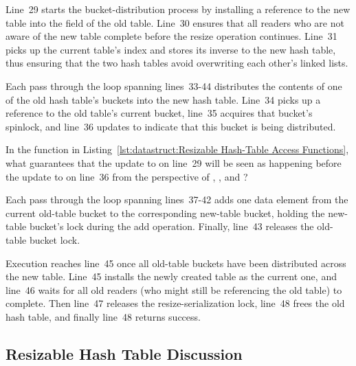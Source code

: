 Line~29 starts the bucket-distribution process by installing a reference
to the new table into the  field of the old table.
Line~30 ensures that all readers who are not aware of the new table
complete before the resize operation continues.
Line~31 picks up the current table's index and stores its inverse to
the new hash table, thus ensuring that the two hash tables avoid overwriting
each other's linked lists.

Each pass through the loop spanning lines~33-44 distributes the contents
of one of the old hash table's buckets into the new hash table.
Line~34 picks up a reference to the old table's current bucket,
line~35 acquires that bucket's spinlock, and line~36 updates
 to indicate that this bucket is being distributed.

\QuickQuiz{}
	In the  function in
	Listing~\ref{lst:datastruct:Resizable Hash-Table Access Functions},
	what guarantees that the update to  on line~29
	will be seen as happening before the update to 
	on line~36 from the perspective of ,
	, and ?
 \QuickQuizEnd

Each pass through the loop spanning lines~37-42 adds one data element
from the current old-table bucket to the corresponding new-table bucket,
holding the new-table bucket's lock during the add operation.
Finally, line~43 releases the old-table bucket lock.

Execution reaches line~45 once all old-table buckets have been distributed
across the new table.
Line~45 installs the newly created table as the current one, and
line~46 waits for all old readers (who might still be referencing
the old table) to complete.
Then line~47 releases the resize-serialization lock, line~48 frees
the old hash table, and finally line~48 returns success.

\subsection{Resizable Hash Table Discussion}
\label{sec:datastruct:Resizable Hash Table Discussion}

